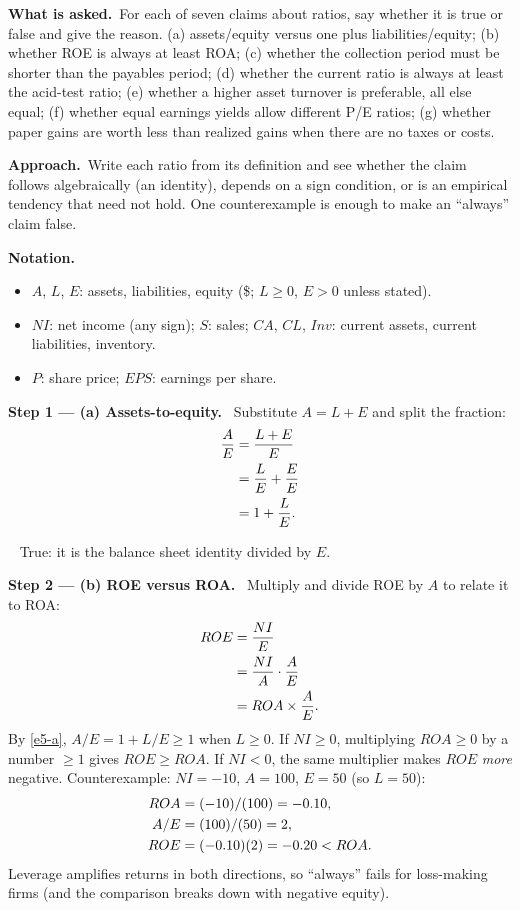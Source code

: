 \documentclass[11pt,a4paper]{article}
\newcommand{\notation}{\par\noindent\textbf{Notation.}}
\newcommand{\step}[2]{\par\medskip\noindent\textbf{Step #1 --- #2.}~}
\newcommand{\asked}{\par\medskip\noindent\textbf{What is asked.}~}
\newcommand{\approach}{\par\smallskip\noindent\textbf{Approach.}~}
\newcommand{\answer}[1]{\par\smallskip\noindent\fbox{\textbf{Answer #1.}}~}
\begin{document}
\asked For each of seven claims about ratios, say whether it is true or false and give the reason.
(a) assets/equity versus one plus liabilities/equity; (b) whether ROE is always at least ROA;
(c) whether the collection period must be shorter than the payables period; (d) whether the
current ratio is always at least the acid-test ratio; (e) whether a higher asset turnover is
preferable, all else equal; (f) whether equal earnings yields allow different P/E ratios;
(g) whether paper gains are worth less than realized gains when there are no taxes or costs.

\approach Write each ratio from its definition and see whether the claim follows algebraically
(an identity), depends on a sign condition, or is an empirical tendency that need not hold. One
counterexample is enough to make an ``always'' claim false.

\notation
\begin{itemize}
  \item $A$, $L$, $E$: assets, liabilities, equity (\$; $L \ge 0$, $E > 0$ unless stated).
  \item $NI$: net income (any sign); $S$: sales; $CA$, $CL$, $Inv$: current assets, current liabilities, inventory.
  \item $P$: share price; $EPS$: earnings per share.
\end{itemize}

\step{1}{(a) Assets-to-equity}
Substitute $A = L + E$ and split the fraction:
\begin{align}
  \frac{A}{E} &= \frac{L + E}{E} \notag\\
  &= \frac{L}{E} + \frac{E}{E} \notag\\
  &= 1 + \frac{L}{E}. \label{e5-a}
\end{align}

\answer{(a)} True: it is the balance sheet identity divided by $E$.

\step{2}{(b) ROE versus ROA}
Multiply and divide ROE by $A$ to relate it to ROA:
\begin{align}
  ROE &= \frac{NI}{E} \notag\\
  &= \frac{NI}{A}\cdot\frac{A}{E} \notag\\
  &= ROA \times \frac{A}{E}. \label{e5-b}
\end{align}
By \eqref{e5-a}, $A/E = 1 + L/E \ge 1$ when $L \ge 0$. If $NI \ge 0$, multiplying $ROA \ge 0$ by a
number $\ge 1$ gives $ROE \ge ROA$. If $NI < 0$, the same multiplier makes $ROE$ \emph{more}
negative. Counterexample: $NI = -10$, $A = 100$, $E = 50$ (so $L = 50$):
\begin{align}
  ROA &= (-10)/(100) = -0.10, \notag\\
  A/E &= (100)/(50) = 2, \notag\\
  ROE &= (-0.10)(2) = -0.20 < ROA. \notag
\end{align}
Leverage amplifies returns in both directions, so ``always'' fails for loss-making firms (and the
comparison breaks down with negative equity).
\end{document}

